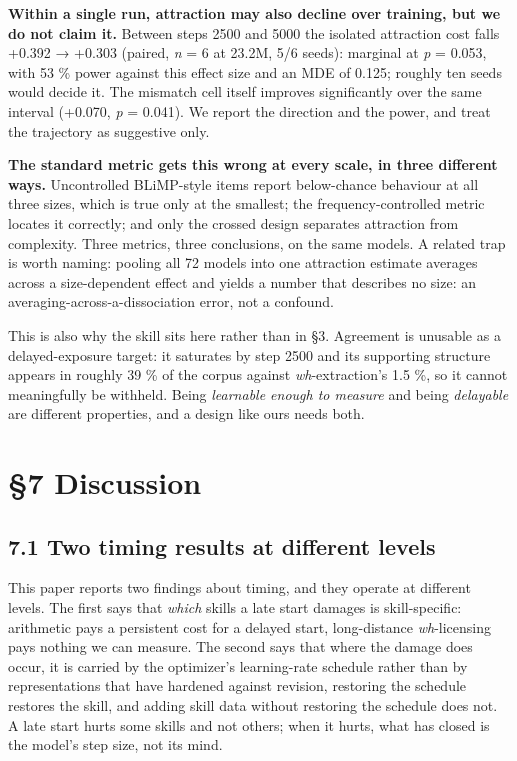 \documentclass[11pt]{article}
\begin{document}
\textbf{Within a single run, attraction may also decline over training, but we do not claim it.}
Between steps 2500 and 5000 the isolated attraction cost falls +0.392 → +0.303 (paired,
\emph{n} = 6 at 23.2M, 5/6 seeds): marginal at \emph{p} = 0.053, with 53 \% power against this effect
size and an MDE of 0.125; roughly ten seeds would decide it. The mismatch cell itself
improves significantly over the same interval (+0.070, \emph{p} = 0.041). We report the direction
and the power, and treat the trajectory as suggestive only.

\textbf{The standard metric gets this wrong at every scale, in three different ways.} Uncontrolled
BLiMP-style items report below-chance behaviour at all three sizes, which is true only at the
smallest; the frequency-controlled metric locates it correctly; and only the crossed design
separates attraction from complexity. Three metrics, three conclusions, on the same models.
A related trap is worth naming: pooling all 72 models into one attraction estimate averages
across a size-dependent effect and yields a number that describes no size: an
averaging-across-a-dissociation error, not a confound.

This is also why the skill sits here rather than in §3. Agreement is unusable as a
delayed-exposure target: it saturates by step 2500 and its supporting structure appears in
roughly 39 \% of the corpus against \emph{wh}-extraction's 1.5 \%, so it cannot meaningfully be
withheld. Being \emph{learnable enough to measure} and being \emph{delayable} are different properties,
and a design like ours needs both.

\section{§7 Discussion}\label{discussion}

\subsection{7.1 Two timing results at different levels}\label{two-timing-results-at-different-levels}

This paper reports two findings about timing, and they operate at different levels. The
first says that \emph{which} skills a late start damages is skill-specific: arithmetic pays a
persistent cost for a delayed start, long-distance \emph{wh}-licensing pays nothing we can
measure. The second says that where the damage does occur, it is carried by the optimizer's
learning-rate schedule rather than by representations that have hardened against revision, restoring the schedule restores the skill, and adding skill data without restoring the
schedule does not. A late start hurts some skills and not others; when it hurts, what has
closed is the model's step size, not its mind.
\end{document}
